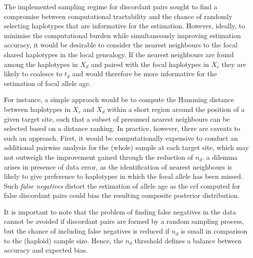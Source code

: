 The implemented sampling regime for discordant pairs sought to find a compromise between computational tractability and the chance of randomly selecting haplotypes that are informative for the estimation.
However, ideally, to minimise the computational burden while simultaneously improving estimation accuracy, it would be desirable to consider the nearest neighbours to the focal shared haplotypes in the local genealogy.
If the nearest neighbours are found among the haplotypes in $X_d$ and paired with the focal haplotypes in $X_c$ they are likely to coalesce  to $t_d$ and would therefore be more informative for the estimation of focal allele age.

For instance, a simple approach would be to compute the Hamming distance between haplotypes in $X_c$ and $X_d$ within a short region around the position of a given target site, such that a subset of presumed nearest neighbours can be selected based on a distance ranking.
In practice, however, there are  caveats to such an approach.
First, it would be computationally expensive to conduct an additional pairwise analysis for the (whole) sample at each target site, which may not outweigh the improvement gained through the reduction of $n_d$.
 a dilemma arises in presence of data error, as the identification of nearest neighbours is likely to give preference to haplotypes in which the focal allele has been missed.
\label{p:falseneg}%
Such \emph{false negatives} distort the estimation of allele age as the \gls{ccf}
computed for false discordant pairs could bias the resulting composite posterior distribution.

It is important to note that the problem of finding false negatives in the data cannot be avoided if discordant pairs are formed by a random sampling process, but the chance of including false negatives is reduced if $n_d$ is small in comparison to the (haploid) sample size.
Hence, the $n_d$ threshold defines a balance between accuracy and expected bias.














